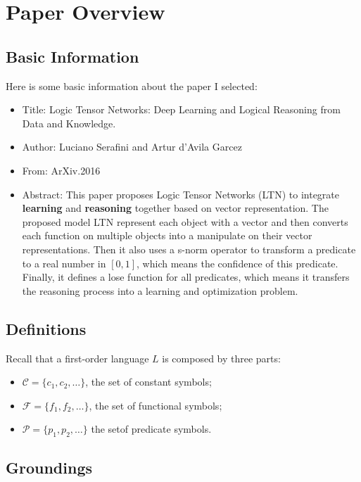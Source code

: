 
\section{Paper Overview}

\subsection{Basic Information}

Here is some basic information about the paper I selected:

\begin{itemize}
    \item Title: Logic Tensor Networks: Deep Learning and Logical Reasoning from Data and Knowledge\cite{serafini2016logic}.
    \item Author: Luciano Serafini and Artur d’Avila Garcez
    \item From: ArXiv.2016
    \item Abstract: This paper proposes Logic Tensor Networks (LTN) to integrate \textbf{learning} and \textbf{reasoning} together based on vector representation. The proposed model LTN represent each object with a vector and then converts each function on multiple objects into a manipulate on their vector representations. Then it also uses a s-norm operator to transform a predicate to a real number in $[0,1]$, which means the confidence of this predicate. Finally, it defines a lose function for all predicates, which means it transfers the reasoning process into a learning and optimization problem.
\end{itemize}

\subsection{Definitions}

Recall that a first-order language $L$ is composed by three parts:
\begin{itemize}
    \item $\mathcal{C}=\{c_1,c_2,\dots\}$, the set of constant symbols;
    \item $\mathcal{F}=\{f_1,f_2,\dots\}$, the set of functional symbols;
    \item $\mathcal{P}=\{p_1,p_2,\dots\}$ the setof predicate symbols.
\end{itemize}


\subsection{Groundings}

